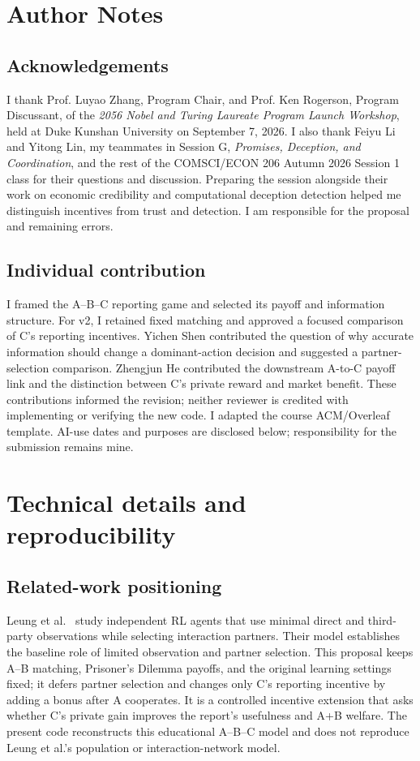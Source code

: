 \clearpage\nobalance
\section*{Author Notes}
\subsection*{Acknowledgements}
I thank Prof. Luyao Zhang, Program Chair, and Prof. Ken Rogerson, Program Discussant, of the \emph{2056 Nobel and Turing Laureate Program Launch Workshop}, held at Duke Kunshan University on September 7, 2026. I also thank Feiyu Li and Yitong Lin, my teammates in Session G, \emph{Promises, Deception, and Coordination}, and the rest of the COMSCI/ECON 206 Autumn 2026 Session 1 class for their questions and discussion. Preparing the session alongside their work on economic credibility and computational deception detection helped me distinguish incentives from trust and detection. I am responsible for the proposal and remaining errors.

\subsection*{Individual contribution}
I framed the A--B--C reporting game and selected its payoff and information structure. For v2, I retained fixed matching and approved a focused comparison of C's reporting incentives. Yichen Shen contributed the question of why accurate information should change a dominant-action decision and suggested a partner-selection comparison. Zhengjun He contributed the downstream A-to-C payoff link and the distinction between C's private reward and market benefit. These contributions informed the revision; neither reviewer is credited with implementing or verifying the new code. I adapted the course ACM/Overleaf template. AI-use dates and purposes are disclosed below; responsibility for the submission remains mine.



\appendix
\section{Technical details and reproducibility}
\subsection*{Related-work positioning}
Leung et al.~\cite{leung2026} study independent RL agents that use minimal direct and third-party observations while selecting interaction partners. Their model establishes the baseline role of limited observation and partner selection. This proposal keeps A--B matching, Prisoner's Dilemma payoffs, and the original learning settings fixed; it defers partner selection and changes only C's reporting incentive by adding a bonus after A cooperates. It is a controlled incentive extension that asks whether C's private gain improves the report's usefulness and A+B welfare. The present code reconstructs this educational A--B--C model and does not reproduce Leung et al.'s population or interaction-network model.

